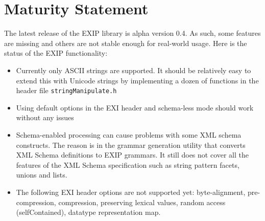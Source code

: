 \section{Maturity Statement}
\label{sec:Maturity-Statement}

The latest release of the EXIP library is alpha version 0.4. As such, 
some features are missing and others are not stable enough for real-world
usage. Here is the status of the EXIP functionality:

\begin{itemize}
 \item Currently only ASCII strings are supported. It should be relatively easy to extend
this with Unicode strings by implementing a dozen of functions in the header
file \texttt{stringManipulate.h}
 \item Using default options in the EXI header and schema-less mode should work without any issues
 \item Schema-enabled processing can cause problems with some XML schema constructs. The reason is in the
grammar generation utility that converts XML Schema definitions to EXIP grammars. It still does not cover
all the features of the XML Schema specification such as string pattern facets, unions and lists.
 \item The following EXI header options are not supported yet: byte-alignment, pre-compression,
compression, preserving lexical values, random access (selfContained), datatype representation map.
\end{itemize}